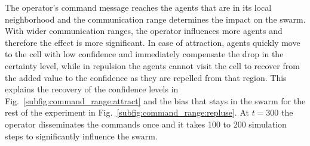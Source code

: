\documentclass[runningheads]{llncs}%
\begin{document}
The operator's command message reaches the agents that are in its local neighborhood and the communication range determines the impact on the swarm. %
With wider communication ranges, the operator influences more agents and therefore the effect is more significant. In case of attraction, agents quickly move to the cell with low confidence and immediately compensate the drop in the certainty level, while in repulsion the agents cannot visit the cell to recover from the added value to the confidence as they are repelled from that region. This explains the recovery of the confidence levels in Fig.~\ref{subfig:command_range:attract} and the bias that stays in the swarm for the rest of the experiment in Fig.~\ref{subfig:command_range:repluse}. At $t=300$ the operator disseminates the commands once and it takes 100 to 200 simulation steps to significantly influence the swarm.
\end{document}
